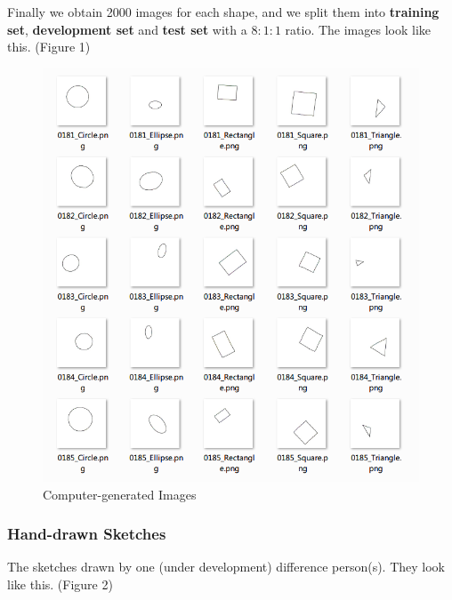 Finally we obtain 2000 images for each shape, and we split them into \textbf{training set}, \textbf{development set} and \textbf{test set} with a $8:1:1$ ratio.  The images look like this. (Figure 1)

\begin{figure}[ht!]
\includegraphics[width=\columnwidth]{Figure_1_CG_Image.png}
\caption{Computer-generated Images}
\end{figure}

\subsubsection{Hand-drawn Sketches}

The sketches drawn by one (under development) difference person(s). They look like this. (Figure 2)

